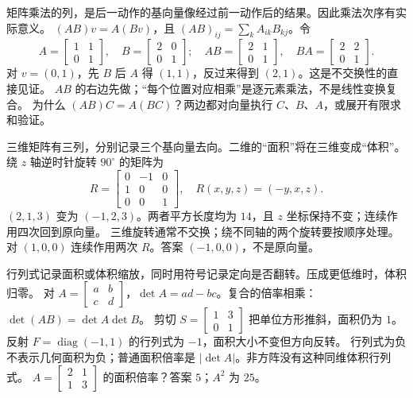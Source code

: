 \idea 矩阵乘法的列，是后一动作的基向量像经过前一动作后的结果。因此乘法次序有实际意义。
\mathpart $(AB)v=A(Bv)$，且 $(AB)_{ij}=\sum_k A_{ik}B_{kj}$。令
\[A=\begin{bmatrix}1&1\\0&1\end{bmatrix},\quad B=\begin{bmatrix}2&0\\0&1\end{bmatrix};\quad
AB=\begin{bmatrix}2&1\\0&1\end{bmatrix},\quad BA=\begin{bmatrix}2&2\\0&1\end{bmatrix}.\]
\examplepart 对 $v=(0,1)$，先 $B$ 后 $A$ 得 $(1,1)$，反过来得到 $(2,1)$。这是不交换性的直接见证。
\pitfall $AB$ 的右边先做；“每个位置对应相乘”是逐元素乘法，不是线性变换复合。
\exercise 为什么 $(AB)C=A(BC)$？两边都对向量执行 $C$、$B$、$A$，或展开有限求和验证。
\nextlesson

\idea 三维矩阵有三列，分别记录三个基向量去向。二维的“面积”将在三维变成“体积”。
\mathpart 绕 $z$ 轴逆时针旋转 $90^\circ$ 的矩阵为
\[R=\begin{bmatrix}0&-1&0\\1&0&0\\0&0&1\end{bmatrix},\quad R(x,y,z)=(-y,x,z).\]
\examplepart $(2,1,3)$ 变为 $(-1,2,3)$。两者平方长度均为 $14$，且 $z$ 坐标保持不变；连续作用四次回到原向量。
\pitfall 三维旋转通常不交换；绕不同轴的两个旋转要按顺序处理。
\exercise 对 $(1,0,0)$ 连续作用两次 $R$。答案 $(-1,0,0)$，不是原向量。
\nextlesson

\idea 行列式记录面积或体积缩放，同时用符号记录定向是否翻转。压成更低维时，体积归零。
\mathpart 对 $A=\left[\begin{smallmatrix}a&b\\c&d\end{smallmatrix}\right]$，$\det A=ad-bc$。复合的倍率相乘：$\det(AB)=\det A\det B$。
\examplepart 剪切 $S=\left[\begin{smallmatrix}1&3\\0&1\end{smallmatrix}\right]$ 把单位方形推斜，面积仍为 $1$。反射 $F=\operatorname{diag}(-1,1)$ 的行列式为 $-1$，面积大小不变但方向反转。
\pitfall 行列式为负不表示几何面积为负；普通面积倍率是 $|\det A|$。非方阵没有这种同维体积行列式。
\exercise $A=\left[\begin{smallmatrix}2&1\\1&3\end{smallmatrix}\right]$ 的面积倍率？答案 $5$；$A^2$ 为 $25$。
\nextlesson

